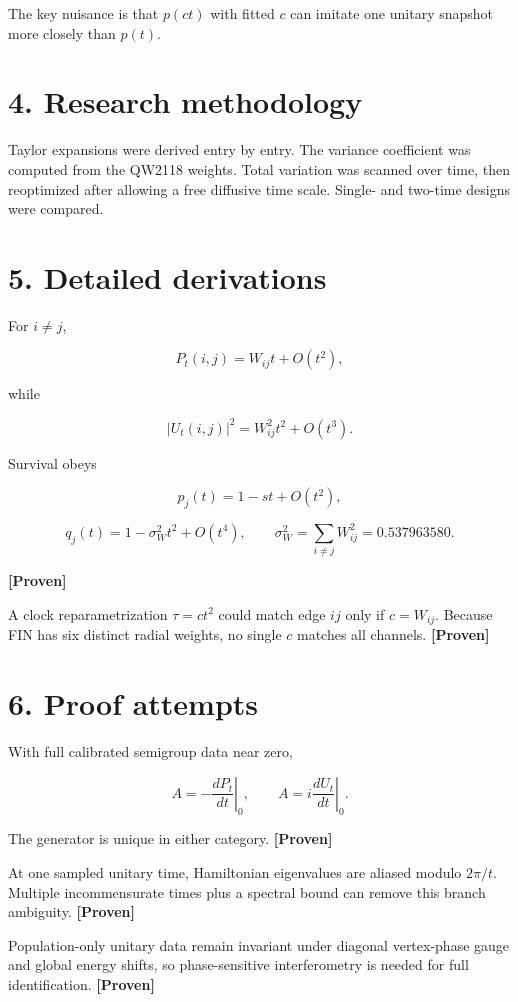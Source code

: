 \documentclass[11pt,a4paper,openany]{report}
\newcommand{\statusProven}{\textcolor{fingreen}{[Proven]}}
\begin{document}
The key nuisance is that \(p(ct)\) with fitted \(c\) can imitate one unitary snapshot more closely than \(p(t)\).

\section{4. Research methodology}

Taylor expansions were derived entry by entry. The variance coefficient was computed from the QW2118 weights. Total variation was scanned over time, then reoptimized after allowing a free diffusive time scale. Single- and two-time designs were compared.

\section{5. Detailed derivations}

For \(i\ne j\),

\[
P_t(i,j)=W_{ij}t+O(t^2),
\]

while

\[
|U_t(i,j)|^2=W_{ij}^2t^2+O(t^3).
\]

Survival obeys

\[
p_j(t)=1-st+O(t^2),
\]

\[
q_j(t)
=1-\sigma_W^2t^2+O(t^4),
\qquad
\sigma_W^2=\sum_{i\ne j}W_{ij}^2=0.537963580.
\]

\textbf{\statusProven{}}

A clock reparametrization \(\tau=ct^2\) could match edge \(ij\) only if \(c=W_{ij}\). Because FIN has six distinct radial weights, no single \(c\) matches all channels. \textbf{\statusProven{}}

\section{6. Proof attempts}

With full calibrated semigroup data near zero,

\[
A=-\left.\frac{dP_t}{dt}\right|_0,\qquad
A=i\left.\frac{dU_t}{dt}\right|_0.
\]

The generator is unique in either category. \textbf{\statusProven{}}

At one sampled unitary time, Hamiltonian eigenvalues are aliased modulo \(2\pi/t\). Multiple incommensurate times plus a spectral bound can remove this branch ambiguity. \textbf{\statusProven{}}

Population-only unitary data remain invariant under diagonal vertex-phase gauge and global energy shifts, so phase-sensitive interferometry is needed for full identification. \textbf{\statusProven{}}
\end{document}
